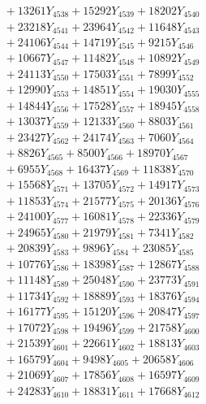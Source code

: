 \documentclass[a4paper,10pt]{article}
\begin{document}
{\begin{align}
&\;  + 13261 Y_{4538} + 15292 Y_{4539} + 18202 Y_{4540} \\[0.3ex]
&\;  + 23218 Y_{4541} + 23964 Y_{4542} + 11648 Y_{4543} \\[0.3ex]
&\;  + 24106 Y_{4544} + 14719 Y_{4545} + 9215 Y_{4546} \\[0.3ex]
&\;  + 10667 Y_{4547} + 11482 Y_{4548} + 10892 Y_{4549} \\[0.3ex]
&\;  + 24113 Y_{4550} + 17503 Y_{4551} + 7899 Y_{4552} \\[0.3ex]
&\;  + 12990 Y_{4553} + 14851 Y_{4554} + 19030 Y_{4555} \\[0.3ex]
&\;  + 14844 Y_{4556} + 17528 Y_{4557} + 18945 Y_{4558} \\[0.5ex]\allowbreak
&\;  + 13037 Y_{4559} + 12133 Y_{4560} + 8803 Y_{4561} \\[0.3ex]
&\;  + 23427 Y_{4562} + 24174 Y_{4563} + 7060 Y_{4564} \\[0.3ex]
&\;  + 8826 Y_{4565} + 8500 Y_{4566} + 18970 Y_{4567} \\[0.3ex]
&\;  + 6955 Y_{4568} + 16437 Y_{4569} + 11838 Y_{4570} \\[0.3ex]
&\;  + 15568 Y_{4571} + 13705 Y_{4572} + 14917 Y_{4573} \\[0.3ex]
&\;  + 11853 Y_{4574} + 21577 Y_{4575} + 20136 Y_{4576} \\[0.3ex]
&\;  + 24100 Y_{4577} + 16081 Y_{4578} + 22336 Y_{4579} \\[0.3ex]
&\;  + 24965 Y_{4580} + 21979 Y_{4581} + 7341 Y_{4582} \\[0.3ex]
&\;  + 20839 Y_{4583} + 9896 Y_{4584} + 23085 Y_{4585} \\[0.3ex]
&\;  + 10776 Y_{4586} + 18398 Y_{4587} + 12867 Y_{4588} \\[0.5ex]\allowbreak
&\;  + 11148 Y_{4589} + 25048 Y_{4590} + 23773 Y_{4591} \\[0.3ex]
&\;  + 11734 Y_{4592} + 18889 Y_{4593} + 18376 Y_{4594} \\[0.3ex]
&\;  + 16177 Y_{4595} + 15120 Y_{4596} + 20847 Y_{4597} \\[0.3ex]
&\;  + 17072 Y_{4598} + 19496 Y_{4599} + 21758 Y_{4600} \\[0.3ex]
&\;  + 21539 Y_{4601} + 22661 Y_{4602} + 18813 Y_{4603} \\[0.3ex]
&\;  + 16579 Y_{4604} + 9498 Y_{4605} + 20658 Y_{4606} \\[0.3ex]
&\;  + 21069 Y_{4607} + 17856 Y_{4608} + 16597 Y_{4609} \\[0.3ex]
&\;  + 24283 Y_{4610} + 18831 Y_{4611} + 17668 Y_{4612} \\[0.3ex]

\end{align}}
\end{document}
